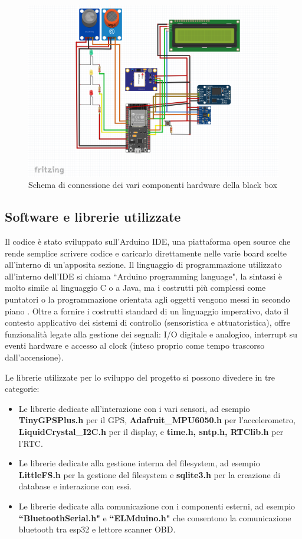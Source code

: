 \documentclass[12pt, a4paper, italian]{report}
\numberwithin{figure}{chapter}
\numberwithin{table}{chapter}
\begin{document}
\begin{figure}[h]
  \centering
  \includegraphics[width=12cm]{circuito_logo.png}
  \caption{Schema di connessione dei vari componenti hardware della black box}
  \label{fig:schemaCircuito}
\end{figure}

\subsection{Software e librerie utilizzate}
Il codice è stato sviluppato sull'Arduino IDE, una piattaforma open source che rende semplice scrivere codice e caricarlo direttamente nelle varie board scelte all'interno di un'apposita sezione. Il linguaggio di programmazione utilizzato all'interno dell'IDE si chiama ``Arduino programming language", la sintassi è molto simile al linguaggio C o a Java, ma i costrutti più complessi come puntatori o la programmazione orientata agli oggetti vengono messi in secondo piano \cite{sistemiEmbeddedAtrent}. Oltre a fornire i costrutti standard di un linguaggio imperativo, dato il contesto applicativo dei sistemi di controllo (sensoristica e attuatoristica), offre funzionalità legate alla gestione dei segnali: I/O digitale e analogico, interrupt su eventi hardware e accesso al clock (inteso proprio come tempo trascorso dall'accensione).

Le librerie utilizzate per lo sviluppo del progetto si possono divedere in tre categorie:

\begin{itemize}
    \item Le librerie dedicate all'interazione con i vari sensori, ad esempio \textbf{TinyGPSPlus.h} per il GPS, \textbf{Adafruit\_MPU6050.h} per l'accelerometro, \textbf{LiquidCrystal\_I2C.h} per il display, e \textbf{time.h, sntp.h, RTClib.h} per l'RTC.
    \item Le librerie dedicate alla gestione interna del filesystem, ad esempio \textbf{LittleFS.h} per la gestione del filesystem e \textbf{sqlite3.h} per la creazione di database e interazione con essi.
    \item Le librerie dedicate alla comunicazione con i componenti esterni, ad esempio \textbf{``BluetoothSerial.h"} e \textbf{``ELMduino.h"} che consentono la comunicazione bluetooth tra esp32 e lettore scanner OBD.
\end{itemize}
\end{document}
